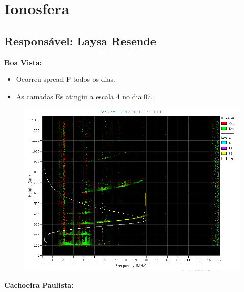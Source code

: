 \documentclass[11pt, oneside]{article}
\begin{document}
\section{Ionosfera} 
 \subsection{Responsável: Laysa Resende} 
 
\textbf{Boa Vista: }

 \begin{itemize}
\item Ocorreu spread-F todos os dias.
\item As camadas Es atingiu a escala 4 no dia 07.
\end{itemize}
\begin{figure}[H]
    \centering
    \includegraphics[width=14cm]{./figures//BoaVista.png}
\end{figure}

\textbf{Cachoeira Paulista:}
\end{document}
